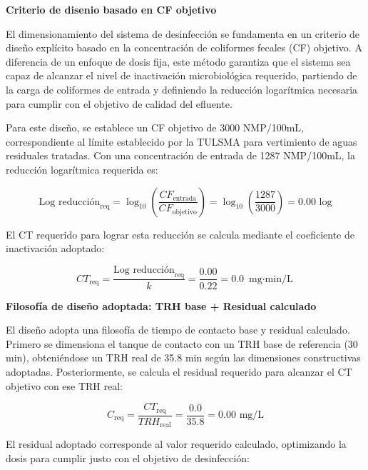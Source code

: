 \documentclass[12pt,a4paper]{article}
\begin{document}
\textbf{Criterio de disenio basado en CF objetivo}

El dimensionamiento del sistema de desinfección se fundamenta en un criterio de diseño explícito basado en la concentración de coliformes fecales (CF) objetivo. A diferencia de un enfoque de dosis fija, este método garantiza que el sistema sea capaz de alcanzar el nivel de inactivación microbiológica requerido, partiendo de la carga de coliformes de entrada y definiendo la reducción logarítmica necesaria para cumplir con el objetivo de calidad del efluente.

Para este diseño, se establece un CF objetivo de 3000 NMP/100mL, correspondiente al límite establecido por la TULSMA para vertimiento de aguas residuales tratadas. Con una concentración de entrada de 1287 NMP/100mL, la reducción logarítmica requerida es:

\begin{equation}
\text{Log reducción}_{\text{req}} = \log_{10}\left(\frac{CF_{\text{entrada}}}{CF_{\text{objetivo}}}\right) = \log_{10}\left(\frac{1287}{3000}\right) = 0.00 \text{ log}
\end{equation}

El CT requerido para lograr esta reducción se calcula mediante el coeficiente de inactivación adoptado:

\begin{equation}
CT_{\text{req}} = \frac{\text{Log reducción}_{\text{req}}}{k} = \frac{0.00}{0.22} = 0.0 \text{ mg$\cdot$min/L}
\end{equation}

\textbf{Filosofía de diseño adoptada: TRH base + Residual calculado}

El diseño adopta una filosofía de tiempo de contacto base y residual calculado. Primero se dimensiona el tanque de contacto con un TRH base de referencia (30 min), obteniéndose un TRH real de 35.8 min según las dimensiones constructivas adoptadas. Posteriormente, se calcula el residual requerido para alcanzar el CT objetivo con ese TRH real:

\begin{equation}
C_{\text{req}} = \frac{CT_{\text{req}}}{TRH_{\text{real}}} = \frac{0.0}{35.8} = 0.00 \text{ mg/L}
\end{equation}

El residual adoptado corresponde al valor requerido calculado, optimizando la dosis para cumplir justo con el objetivo de desinfección:
\end{document}
